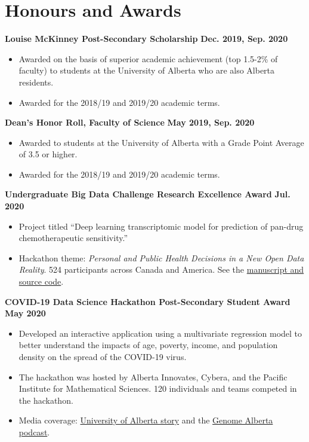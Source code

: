 \documentclass{article}
\begin{document}
\section*{\textcolor{my_colour}{Honours and Awards}}
\vspace{-.25em} \hrulefill \vspace{.75em}

\textbf{Louise McKinney Post-Secondary Scholarship} \hfill \textbf{Dec. 2019, Sep. 2020}
\begin{itemize}
    \item Awarded on the basis of superior academic achievement (top 1.5-2\% of faculty) to students at the University of Alberta who are also Alberta residents.
    \item Awarded for the 2018/19 and 2019/20 academic terms.
\end{itemize}

\textbf{Dean's Honor Roll, Faculty of Science} \hfill \textbf{May 2019, Sep. 2020}
\begin{itemize}
    \item Awarded to students at the University of Alberta with a Grade Point Average of 3.5 or higher.
    \item Awarded for the 2018/19 and 2019/20 academic terms.
\end{itemize}

\textbf{Undergraduate Big Data Challenge Research Excellence Award} \hfill \textbf{Jul. 2020}
\begin{itemize}
    \item Project titled ``Deep learning transcriptomic model for prediction of pan-drug chemotherapeutic sensitivity.''
    \item Hackathon theme: \textit{Personal and Public Health Decisions in a New Open Data Reality}. 524 participants across Canada and America. See the \href{https://github.com/tig3r66/youreka_genes}{manuscript and source code}.
\end{itemize}

\textbf{COVID-19 Data Science Hackathon Post-Secondary Student Award} \hfill \textbf{May 2020}
\begin{itemize}
    \item Developed an interactive application using a multivariate regression model to better understand the impacts of age, poverty, income, and population density on the spread of the COVID-19 virus.
    \item The hackathon was hosted by Alberta Innovates, Cybera, and the Pacific Institute for Mathematical Sciences. 120 individuals and teams competed in the hackathon.
    \item Media coverage: \href{https://www.folio.ca/students-develop-online-tool-to-predict-covid-19-spread-based-on-demographics/}{University of Alberta story} and the \href{https://genomealberta.ca/genomics/genomics_blog_08182001.aspx}{Genome Alberta podcast}.
\end{itemize}
\end{document}
